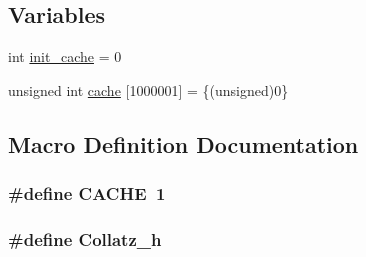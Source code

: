 \subsection*{Variables}
\begin{DoxyCompactItemize}
\item 
int \hyperlink{SphereCollatz_8c_09_09_a4aec11a6e1b7cdca65df7232bfecb3de}{init\-\_\-cache} = 0
\item 
unsigned int \hyperlink{SphereCollatz_8c_09_09_a117b8639e485388b199bd815b5490f1e}{cache} \mbox{[}1000001\mbox{]} = \{(unsigned)0\}
\end{DoxyCompactItemize}


\subsection{Macro Definition Documentation}
\hypertarget{SphereCollatz_8c_09_09_a43fd55aa78bd891ebbd6a450f5eecce4}{
\subsubsection[{C\-A\-C\-H\-E}]{\setlength{\rightskip}{0pt plus 5cm}\#define C\-A\-C\-H\-E~1}}\label{SphereCollatz_8c_09_09_a43fd55aa78bd891ebbd6a450f5eecce4}
\hypertarget{SphereCollatz_8c_09_09_a2fd0c8b04afe9b743ed1748a94cbaee1}{
\subsubsection[{Collatz\-\_\-h}]{\setlength{\rightskip}{0pt plus 5cm}\#define Collatz\-\_\-h}}\label{SphereCollatz_8c_09_09_a2fd0c8b04afe9b743ed1748a94cbaee1}


